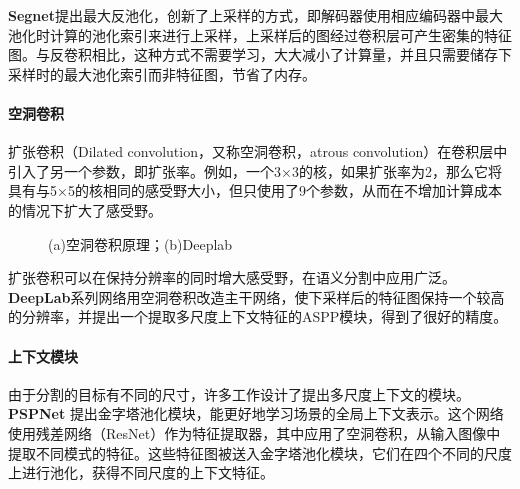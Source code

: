\documentclass[11pt]{article}
\begin{document}
\textbf{Segnet}\cite{ref2}提出最大反池化，创新了上采样的方式，即解码器使用相应编码器中最大池化时计算的池化索引来进行上采样，上采样后的图经过卷积层可产生密集的特征图。与反卷积相比，这种方式不需要学习，大大减小了计算量，并且只需要储存下采样时的最大池化索引而非特征图，节省了内存。

\paragraph{空洞卷积}
扩张卷积（Dilated convolution，又称空洞卷积，atrous convolution）在卷积层中引入了另一个参数，即扩张率。例如，一个3×3的核，如果扩张率为2，那么它将具有与5×5的核相同的感受野大小，但只使用了9个参数，从而在不增加计算成本的情况下扩大了感受野。
\begin{figure}[H]
    \centering
    \centering
    \caption{(a)空洞卷积原理；(b)Deeplab\cite{ref4}}
\end{figure}


扩张卷积可以在保持分辨率的同时增大感受野，在语义分割中应用广泛。\textbf{DeepLab}\cite{de1,ref4,de3,de3+}系列网络用空洞卷积改造主干网络，使下采样后的特征图保持一个较高的分辨率，并提出一个提取多尺度上下文特征的ASPP模块，得到了很好的精度。



\paragraph{上下文模块}
由于分割的目标有不同的尺寸，许多工作设计了提出多尺度上下文的模块。
\textbf{PSPNet} \cite{2016Pyramid}提出金字塔池化模块，能更好地学习场景的全局上下文表示。这个网络使用残差网络（ResNet）作为特征提取器，其中应用了空洞卷积，从输入图像中提取不同模式的特征。这些特征图被送入金字塔池化模块，它们在四个不同的尺度上进行池化，获得不同尺度的上下文特征。
\end{document}
